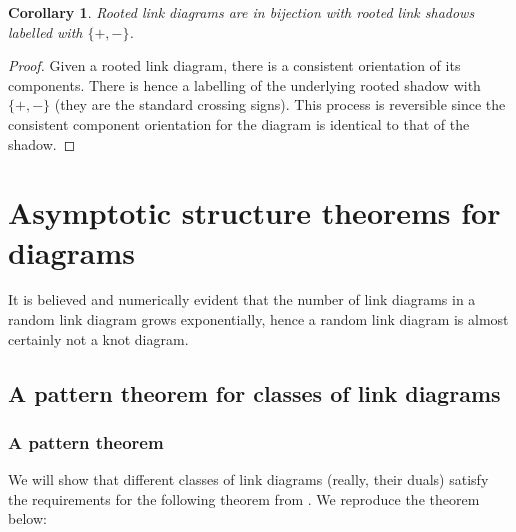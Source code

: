 \documentclass[amsmath,longbibliography,secnumarabic,floatfix,amssymb,nofootinbib,nobibnotes,letterpaper,11pt,notitlepage,tightenlines]{revtex4-1}
\newtheorem{corollary}[theorem]{Corollary}
\begin{document}
\begin{corollary}
  Rooted link diagrams are in bijection with rooted link shadows
  labelled with $\{+, -\}$.
\end{corollary}

\begin{proof}
  Given a rooted link diagram, there is a consistent orientation of
  its components. There is hence a labelling of the underlying rooted
  shadow with $\{+, -\}$ (they are the standard crossing signs). This
  process is reversible since the consistent component orientation for
  the diagram is identical to that of the shadow.
\end{proof}

\section{Asymptotic structure theorems for diagrams}
\label{sec:structure}

It is believed and numerically evident \cite{PZJasympconj2004} that the number of link diagrams in a
random link diagram grows exponentially, hence a random link diagram is almost certainly not a knot
diagram.

\subsection{A pattern theorem for classes of link diagrams}
\label{sec:patternthm}

\newcommand{\MapClass}{\mathscr{M}}

\subsubsection{A pattern theorem}
\label{sec:weakpatternthm}

We will show that different classes of link diagrams (really, their duals) satisfy the requirements
for the following theorem from \cite{Bender1992104}. We reproduce the theorem below:
\end{document}
